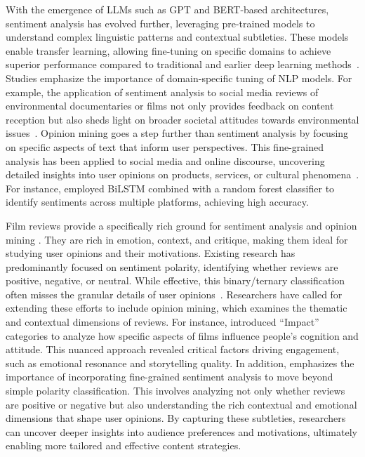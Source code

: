 With the emergence of LLMs such as GPT and BERT-based architectures, sentiment analysis has evolved further, leveraging pre-trained models to understand complex linguistic patterns and contextual subtleties\cite{sayeed2023bert,chang2024survey}. These models enable transfer learning, allowing fine-tuning on specific domains to achieve superior performance compared to traditional and earlier deep learning methods~\cite{10.1145/3543873.3587324, arxiv_2407.13069}. 
Studies emphasize the importance of domain-specific tuning of NLP models. For example, the application of sentiment analysis to social media reviews of environmental documentaries or films not only provides feedback on content reception but also sheds light on broader societal attitudes towards environmental issues~\citep{acerbi2023sentiment}.
Opinion mining goes a step further than sentiment analysis by focusing on specific aspects of text that inform user perspectives. This fine-grained analysis has been applied to social media and online discourse, uncovering detailed insights into user opinions on products, services, or cultural phenomena~\citep{asurveyof2012opinion, kapur2022sentimentanalysis, Gerard_Botzer_Weninger_2023}.
For instance, \citep{kapur2022sentimentanalysis} employed BiLSTM combined with a random forest classifier to identify sentiments across multiple platforms, achieving high accuracy. 

Film reviews provide a specifically rich ground for sentiment analysis and opinion mining \cite{malini2019opinion}. They are rich in emotion, context, and critique, making them ideal for studying user opinions and their motivations. Existing research has predominantly focused on sentiment polarity, identifying whether reviews are positive, negative, or neutral. While effective, this binary/ternary classification often misses the granular details of user opinions~\citep{Mrabti2024AnEM, 10.5120/ijca2017916005}.
Researchers have called for extending these efforts to include opinion mining, which examines the thematic and contextual dimensions of reviews. For instance, \citep{rezapour2017classification} introduced ``Impact'' categories to analyze how specific aspects of films influence people's cognition and attitude. This nuanced approach revealed critical factors driving engagement, such as emotional resonance and storytelling quality. In addition, \cite{yue2019survey} emphasizes the importance of incorporating fine-grained sentiment analysis to move beyond simple polarity classification. This involves analyzing not only whether reviews are positive or negative but also understanding the rich contextual and emotional dimensions that shape user opinions. By capturing these subtleties, researchers can uncover deeper insights into audience preferences and motivations, ultimately enabling more tailored and effective content strategies.

